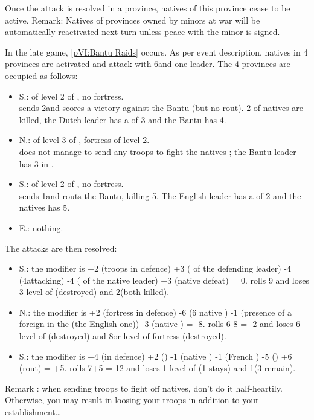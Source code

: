 \bparag Once the attack is resolved in a province, natives of this province
cease to be active.
\bparag Remark: Natives of provinces owned by \ROTW minors at war will be
automatically reactivated next turn unless peace with the minor is signed.


\begin{exemple}
  In the late game, \ref{pVI:Bantu Raids} occurs. As per event description,
  natives in 4 provinces are activated and attack with 6\LD and one
  leader. The 4 provinces are occupied as follows:
  \begin{itemize}
  \item \granderegionNyasa S.: \TP of level 2 of \HOL, no fortress.\\
    \HOL sends 2\LD and scores a victory against the Bantu (but no rout). 2\LD
    of natives are killed, the Dutch leader has a  of 3 and
    the Bantu has 4.
  \item \granderegionNatal N.: \TP of level 3 of \FRA, fortress of level 2.\\
    \FRA does not manage to send any troops to fight the natives ; the Bantu
    leader has 3 in .
  \item \granderegionNatal S.: \TP of level 2 of \ANG, no fortress.\\
    \ANG sends 1\ARMY\Faceplus and routs the Bantu, killing 5\LD. The English
    leader has a  of 2 and the natives has 5.
  \item \granderegionCap E.: nothing.
  \end{itemize}
  The attacks are then resolved:
  \begin{itemize}
  \item \granderegionNyasa S.: the modifier is +2 (troops in defence) +3
    ( of the defending leader) -4 (4\LD attacking) -4
    ( of the native leader) +3 (native defeat) = 0. \HOL
    rolls 9 and loses 3 level of \TP (destroyed) and 2\LD (both killed).
  \item \granderegionNatal N.: the modifier is +2 (fortress in defence) -6 (6
    native \LD) -1 (presence of a foreign \TP in the \Area (the English one))
    -3 (native ) = -8. \FRA rolls 6-8 = -2 and loses 6 level
    of \TP (destroyed) and 8\LD or level of fortress (destroyed).
  \item \granderegionNatal S.: the modifier is +4 (\LD in defence) +2
    () -1 (native \LD) -1 (French \TP) -5 ()
    +6 (rout) = +5. \ANG rolls 7+5 = 12 and loses 1 level of \TP (1 stays) and
    1\LD (3 remain).
  \end{itemize}
  Remark : when sending troops to fight off natives, don't do it
  half-heartily. Otherwise, you may result in loosing your troops in addition
  to your establishment\ldots
\end{exemple}

